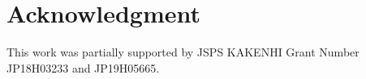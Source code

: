 \documentclass[conference]{IEEEtran}
\begin{document}
\section*{Acknowledgment}
This work was partially supported by JSPS KAKENHI Grant Number JP18H03233 and JP19H05665.




\end{document}
